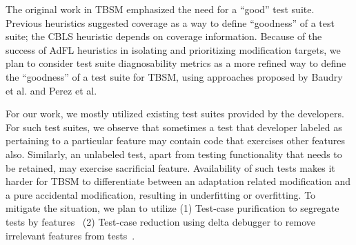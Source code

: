 The original work in TBSM emphasized the need for a “good” test suite. Previous heuristics suggested coverage as a way to define “goodness” of a test suite; the CBLS heuristic depends on coverage information. Because of the success of AdFL heuristics in isolating and prioritizing modification targets, we plan to consider test suite diagnosability metrics as a more refined way to define the “goodness” of a test suite for TBSM, using approaches proposed by Baudry et al. and Perez et al.~\cite{Baudry2006improving,perez2017diagnosibility}

For our work, we mostly utilized existing test suites provided by the developers. For such test suites, we observe that sometimes a test that developer labeled as pertaining to a particular feature may contain code that exercises other features also. Similarly, an unlabeled test, apart from testing functionality that needs to be retained, may exercise sacrificial feature.  Availability of such tests makes it harder for TBSM to differentiate between an adaptation related modification and a pure accidental modification, resulting in underfitting or overfitting. To mitigate the situation, we plan to utilize (1) Test-case purification to segregate tests by features~\cite{xuan2014test} (2) Test-case reduction using delta debugger to remove irrelevant features from tests~\cite{stvrcausereduce,christi18reduce}.  
